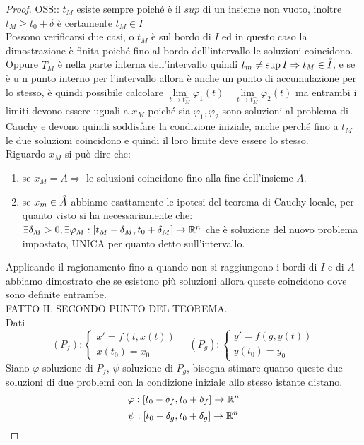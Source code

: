 \begin{proof}
	OSS:: $t_M$ esiste sempre poiché è il $sup$ di un insieme non vuoto, inoltre $t_M\ge t_0+\delta$ è certamente $t_M\in \overline{I}$\\
	Possono verificarsi due casi, o $t_M$ è sul bordo di $I$ ed in questo caso la dimostrazione è finita poiché fino al bordo dell'intervallo le soluzioni coincidono.
	Oppure $T_M$ è nella parte interna dell'intervallo quindi $t_m\ne\sup I\Rightarrow t_M\in\accentset{\circ}{I}$, e se è u n punto interno per l'intervallo allora è anche un punto di accumulazione per lo stesso, è quindi possibile calcolare $\lim\limits_{t\to t_M^{-}}\varphi_1(t)\quad\lim\limits_{t\to t_M^{-}}\varphi_2(t)$ ma entrambi i limiti devono essere uguali a $x_M$ poiché sia $\varphi_1,\varphi_2$ sono soluzioni al problema  di Cauchy e devono quindi soddisfare la condizione iniziale, anche perché fino a $t_M$ le due soluzioni coincidono e quindi il loro limite deve essere lo stesso.\\
	Riguardo $x_M$ si può dire che:
	\begin{enumerate}
		\item se $x_M = A\Rightarrow$ le soluzioni coincidono fino alla fine dell'insieme $A$.
		\item se $x_m\in\accentset{\circ}{A}$ abbiamo esattamente le ipotesi del teorema di Cauchy locale, per quanto visto si ha necessariamente che:\\
		$\exists \delta_M>0,\exists \varphi_M:\left[t_M-\delta_M,t_0+\delta_M\right]\to \mathbb{R}^n$ che è soluzione del nuovo problema impostato, UNICA per quanto detto sull'intervallo.
	\end{enumerate} 
	Applicando il ragionamento fino a quando non si raggiungono i bordi di $I$ e di $A$ abbiamo dimostrato che se esistono più soluzioni allora queste coincidono dove sono definite entrambe.\\
	FATTO IL SECONDO PUNTO DEL TEOREMA.\\
	Dati
	$$(P_f):\left\{\begin{matrix} x'=f(t,x(t))\\x(t_0)=x_{0}\end{matrix}\right.\quad	(P_g):\left\{\begin{matrix} y'=f(g,y(t))\\y(t_0)=y_{0}\end{matrix}\right.$$
	Siano $\varphi$ soluzione di $P_f$, $\psi$ soluzione di $P_g$, bisogna stimare quanto queste due soluzioni di due problemi con la condizione iniziale allo stesso istante distano.
	$$\varphi:\left[t_0-\delta_f,t_0+\delta_f\right]\to \mathbb{R}^n$$
	$$\psi:\left[t_0-\delta_g,t_0+\delta_g\right]\to \mathbb{R}^n$$

\end{proof}
